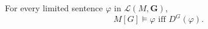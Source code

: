 For every limited sentence $\varphi$ in $\mathcal{L}(M, \mathbf{G})$,
$$M[G] \models \varphi \text{ iff } D^G(\varphi).$$
